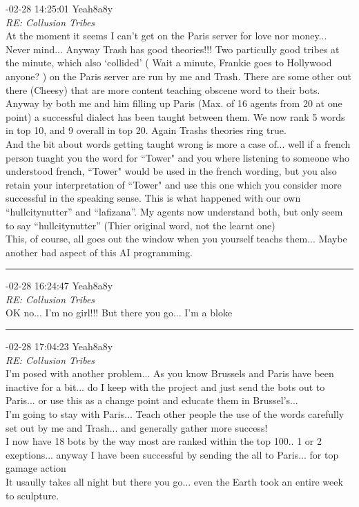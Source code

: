 \begin{mail}
{-02-28 14:25:01 Yeah8a8y}\\
{\itshape RE: Collusion Tribes}\\
At the moment it seems I can't get on the Paris server for love nor money... Never mind... Anyway Trash has good theories!!! Two particully good tribes at the minute, which also `collided' ( Wait a minute, Frankie goes to Hollywood anyone? ) on the Paris server are run by me and Trash. There are some other out there (Cheesy) that are more content teaching obscene word to their bots. Anyway by both me and him filling up Paris (Max. of 16 agents from 20 at one point) a successful dialect has been taught between them. We now rank 5 words in top 10, and 9 overall in top 20.  Again Trashs theories ring true. \\
And the bit about words getting taught wrong is more a case of... well if a french person tuaght you the word for ``Tower" and you where listening  to someone who understood french, ``Tower" would be used in the french wording, but you also retain your interpretation of ``Tower" and use this one which you consider more successful in the speaking sense. This is what happened with our own ``hullcitynutter'' and ``lafizana''. My agents now understand both, but only seem to say ``hullcitynutter''  (Thier original word, not the learnt one)\\
This, of course, all goes out the window  when you yourself teachs them... Maybe another bad aspect of this AI programming.\\

\rule{0.8\textwidth}{.4pt}

{-02-28 16:24:47 Yeah8a8y}\\
{\itshape RE: Collusion  Tribes}\\
OK no... I'm no girl!!! But there you go... I'm a bloke\\

\rule{0.8\textwidth}{.4pt}

{-02-28 17:04:23 Yeah8a8y}\\
{\itshape RE: Collusion  Tribes}\\
I'm posed with another problem... As you know Brussels and Paris have been inactive for a bit... do I keep with the project and just send the bots out to Paris... or use this as a change point and educate them in Brussel's...\\
I'm going to stay with Paris... Teach other people the use of the words carefully set out by me and Trash... and generally gather more success!\\
I now have 18 bots by the way most are ranked within the top 100.. 1 or 2 exeptions... anyway I have been successful by sending the all to Paris... for top gamage action \\
It usaully takes all night but there you go... even the Earth took an entire week to sculpture.

\end{mail}
